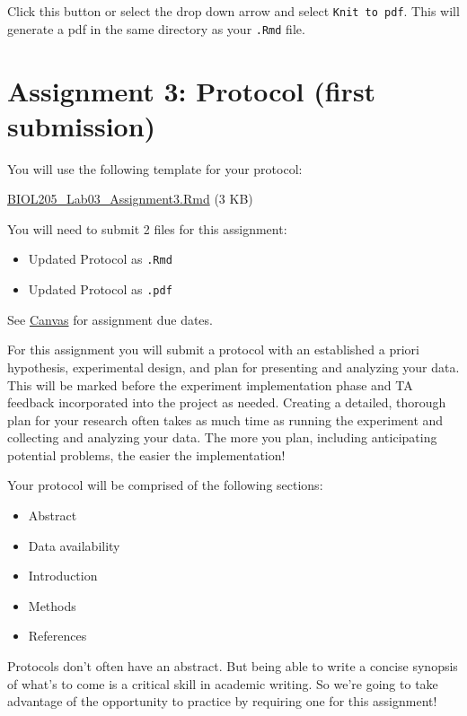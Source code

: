 \documentclass[
]{book}
\providecommand{\tightlist}{%
  \setlength{\itemsep}{0pt}\setlength{\parskip}{0pt}}
\begin{document}
Click this button or select the drop down arrow and select \texttt{Knit\ to\ pdf}. This will generate a pdf in the same directory as your \texttt{.Rmd} file.

\hypertarget{assignment-3-protocol-first-submission}{%
\chapter*{Assignment 3: Protocol (first submission)}\label{assignment-3-protocol-first-submission}}

You will use the following template for your protocol:

\href{https://osf.io/download/qhc2v}{BIOL205\_Lab03\_Assignment3.Rmd} (3 KB)

You will need to submit 2 files for this assignment:

\begin{itemize}
\tightlist
\item
  Updated Protocol as \texttt{.Rmd}
\item
  Updated Protocol as \texttt{.pdf}
\end{itemize}

See \href{https://canvas.ubc.ca}{Canvas} for assignment due dates.

For this assignment you will submit a protocol with an established a priori hypothesis, experimental design, and plan for presenting and analyzing your data. This will be marked before the experiment implementation phase and TA feedback incorporated into the project as needed. Creating a detailed, thorough plan for your research often takes as much time as running the experiment and collecting and analyzing your data. The more you plan, including anticipating potential problems, the easier the implementation!

Your protocol will be comprised of the following sections:

\begin{itemize}
\tightlist
\item
  Abstract
\item
  Data availability
\item
  Introduction
\item
  Methods
\item
  References
\end{itemize}

Protocols don't often have an abstract. But being able to write a concise synopsis of what's to come is a critical skill in academic writing. So we're going to take advantage of the opportunity to practice by requiring one for this assignment!
\end{document}
